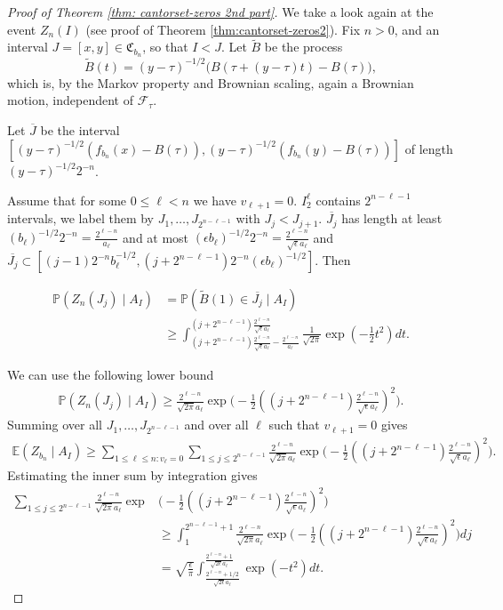 \documentclass[11pt,reqno]{amsart}
\theoremstyle{plain}
\theoremstyle{definition}
\theoremstyle{remark}
\begin{document}
\begin{proof}[Proof of Theorem \ref{thm: cantorset-zeros 2nd part}]
We take a look again at the event $Z_n(I)$ (see proof of Theorem \ref{thm:cantorset-zeros2}). Fix $n>0$, and an interval $J=[x,y] \in \mathfrak{C}_{b_n}$, so that $I<J$. Let $\widetilde{B}$ be the process
\[\widetilde{B}(t)=(y-\tau)^{-1/2}\Big(B(\tau+(y-\tau) t)-B(\tau)\Big),\]
which is, by the Markov property and Brownian scaling, again a Brownian motion, independent of $\mathcal{F}_{\tau}$. 

Let $\overline{J}$ be the interval $[(y-\tau)^{-1/2}(f_{b_n}(x)-B(\tau)), (y-\tau)^{-1/2}(f_{b_n}(y)-B(\tau))]$ of length $(y-\tau)^{-1/2}2^{-n}$.

Assume that for some $0 \leq \ell < n$ we have $v_{\ell+1}=0$. $I_2^\ell$ contains $2^{n-\ell-1}$ intervals, we label them by $J_1, \dots, J_{2^{n-\ell-1}}$ with $J_j < J_{j+1}$. $\overline{J_j}$ has length at least $(b_\ell)^{-1/2}2^{-n} = \frac{2^{\ell-n}}{a_\ell}$ and at most $(\epsilon b_\ell)^{-1/2}2^{-n}= \frac{2^{\ell-n}}{\sqrt{\epsilon}a_\ell}$ and $\overline{J_j} \subset [(j-1)2^{-n}b_\ell^{-1/2}, (j+2^{n-\ell-1})2^{-n}(\epsilon b_\ell)^{-1/2}]$. Then 

\begin{align}\label{eq: exact conditional probabilities}
\mathbb{P}(Z_n(J_j) \mid A_I) &= \mathbb{P}(\widetilde{B}(1) \in \overline{J_j} \mid A_I)\\
&\geq \int_{(j+2^{n-\ell-1})\frac{2^{\ell-n}}{\sqrt{\epsilon}a_\ell}-\frac{2^{\ell-n}}{a_\ell}}^{(j+2^{n-\ell-1})\frac{2^{\ell-n}}{\sqrt{\epsilon}a_\ell}} \frac{1}{\sqrt{2\pi}}\exp (-\frac{1}{2}t^2) dt.
\end{align}

We can use the following lower bound
\begin{align}\label{eq: conditional probabilities lower estimate}
\mathbb{P}(Z_n(J_j) \mid A_I)  \geq \frac{2^{\ell-n}}{\sqrt{2\pi}a_\ell} \exp\Big(-\frac{1}{2} {((j+2^{n-\ell-1})\frac{2^{\ell-n}}{\sqrt{\epsilon}a_\ell})^2}\Big).
\end{align}
Summing over all $J_1, \dots, J_{2^{n-\ell-1}}$ and over all $\ell$ such that $v_{\ell+1}=0$ gives
\begin{align*}
\mathbb{E} (Z_{b_n} \mid A_I) \geq 
\sum_{1 \leq \ell \leq n: v_\ell=0} \sum_{1\leq j \leq 2^{n-\ell-1}}  \frac{2^{\ell-n}}{\sqrt{2\pi}a_\ell} \exp\Big(-\frac{1}{2} {((j+2^{n-\ell-1})\frac{2^{\ell-n}}{\sqrt{\epsilon}a_\ell})^2}\Big).
\end{align*}
Estimating the inner sum by integration gives
\begin{align}\label{eq: integral estimate}
\sum_{1\leq j \leq 2^{n-\ell-1}}  \frac{2^{\ell-n}}{\sqrt{2\pi}a_\ell} \exp &\Big(-\frac{1}{2} {((j+2^{n-\ell-1})\frac{2^{\ell-n}}{\sqrt{\epsilon}a_\ell})^2}\Big)
\\&\geq \int_1^{2^{n-\ell-1}+1} \frac{2^{\ell-n}}{\sqrt{2\pi}a_\ell} \exp\Big(-\frac{1}{2} {((j+2^{n-\ell-1})\frac{2^{\ell-n}}{\sqrt{\epsilon}a_\ell})^2}\Big) dj\\
&= \sqrt{\frac{\epsilon}{\pi}} \int_{\frac{2^{\ell - n}+1/2}{\sqrt{2\epsilon}a_\ell}}^{\frac{2^{\ell - n}+1}{\sqrt{2\epsilon}a_\ell}} \exp (-t^2) dt.
\end{align}


\end{proof}
\end{document}
